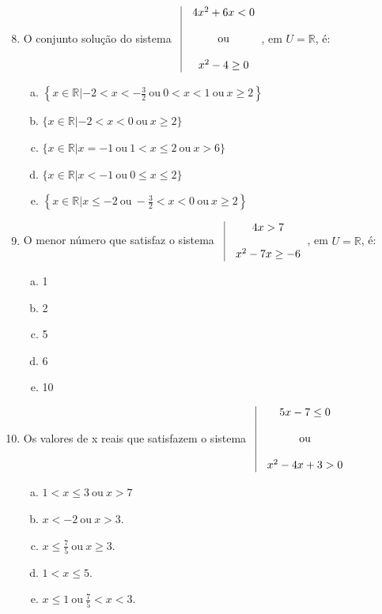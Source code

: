 \documentclass[a4paper,14pt]{article}
\begin{document}
	\begin{enumerate}
		\setcounter{enumi}{7}
		\item O conjunto solução do sistema $\begin{array}{rcl|c}
			\vline & 4x^2 + 6x < 0 \\
			\vline & \\
			\vline & \text{ou}\\
			\vline & \\
			\vline & x^2 -4 \geq 0 \\
		\end{array}
		$, em $U = \mathbb{R}$, é:
		\begin{enumerate}[a)]
			\item $\left\{ x \in \mathbb{R} | -2 < x < -\frac{3}{2}~\text{ou}~0 < x < 1~\text{ou}~x \geq 2 \right\}$
			\item $\{x \in \mathbb{R} | -2 < x < 0~\text{ou}~x \geq 2\}$
			\item $\{x \in \mathbb{R} | x = -1~\text{ou}~1 < x \leq 2~\text{ou}~x > 6\}$
			\item $\{x \in \mathbb{R} | x < -1~\text{ou}~0 \leq x \leq 2\}$
			\item $\left\{x \in \mathbb{R} | x \leq -2~\text{ou}~-\frac{3}{2} < x < 0~\text{ou}~x \geq 2 \right\}$ \newpage~
		\end{enumerate}
		\item O menor número que satisfaz o sistema $ 
		\begin{array}{rcl|c}
			\vline & 4x > 7 \\
			\vline & \\
			\vline & x^2 - 7x \geq -6 \\
		\end{array}
		$, em $U = \mathbb{R}$, é:
		\begin{enumerate}[a)]
			\item 1
			\item 2
			\item 5
			\item 6
			\item 10 \newpage
		\end{enumerate}
		\item Os valores de x reais que satisfazem o sistema $ 
		\begin{array}{rcl|c}
			\vline & 5x - 7 \leq 0\\
			\vline & \\
			\vline & \text{ou}\\
			\vline & \\
			\vline & x^2 - 4x + 3 > 0 \\
		\end{array}
		$ 
		\begin{enumerate}[a)]
			\item $1 < x \leq 3~\text{ou}~x > 7$
			\item $x < -2~\text{ou}~x > 3$. 
			\item $x \leq \frac{7}{5}~\text{ou}~x \geq 3$.
			\item $1 < x \leq 5$.
			\item $x \leq 1~\text{ou}~\frac{7}{5} < x < 3$.
		\end{enumerate}
	\end{enumerate}
\end{document}
